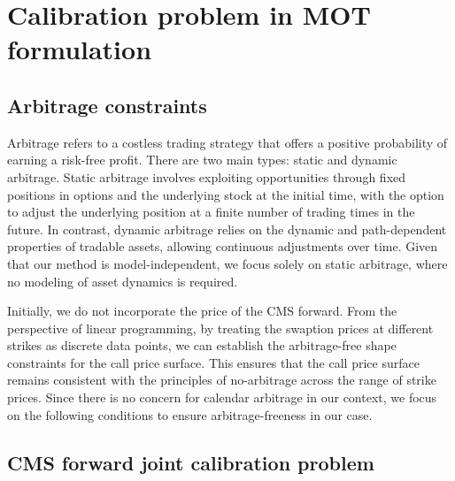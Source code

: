\chapter{Calibration problem in MOT formulation}
\section{Arbitrage constraints}
Arbitrage refers to a costless trading strategy that offers a positive probability of 
earning a risk-free profit. There are two main types: static and dynamic arbitrage. 
Static arbitrage involves exploiting opportunities through fixed positions in options and the 
underlying stock at the initial time, with the option to adjust the underlying position at a 
finite number of trading times in the future. In contrast, dynamic arbitrage relies on the 
dynamic and path-dependent properties of tradable assets, allowing continuous adjustments over 
time. Given that our method is model-independent, we focus solely on static arbitrage, where no 
modeling of asset dynamics is required.

Initially, we do not incorporate the price of the CMS forward. From the perspective of linear 
programming, by treating the swaption prices at different strikes as discrete data points, 
we can establish the arbitrage-free shape constraints for the call price surface. This ensures 
that the call price surface remains consistent with the principles of no-arbitrage across the 
range of strike prices. Since there is no concern for calendar arbitrage in our context, 
we focus on the following conditions to ensure arbitrage-freeness in our case.




\section{CMS forward joint calibration problem}

